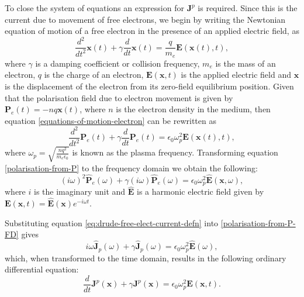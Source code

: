 To close the system of equations an expression for $\mathbf{J}^p$ is required. Since this is the current due to movement of free electrons, we begin by writing the Newtonian equation of motion of a free electron in the presence of an applied electric field, as
\begin{equation}
\frac{d^2}{dt^2}\mathbf{x}(t) + \gamma \frac{d}{dt} \mathbf{x}(t) = \frac{q}{m_e}\mathbf{E}(\mathbf{x}(t),t),
\label{equations-of-motion-electron}
\end{equation}
where $\gamma$ is a damping coefficient or collision frequency, $m_e$ is the mass of an electron, $q$ is the charge of an electron, $\mathbf{E}(\mathbf{x},t)$ is the applied electric field and $\mathbf{x}$ is the displacement of the electron from its zero-field equilibrium position. Given that the polarisation field due to electron movement is given by $ \mathbf{P}_e(t) = - n q \mathbf{x}(t)$, where $n$ is the electron density in the medium, then equation \ref{equations-of-motion-electron} can be rewritten as
\begin{equation}
\label{polarisation-from-P}
\frac{d^2}{dt^2}\mathbf{P}_e(t) + \gamma \frac{d}{dt} \mathbf{P}_e(t) = \epsilon_0 \omega_p^2 \mathbf{E}(\mathbf{x}(t),t),
\end{equation}
where $\omega_p = \sqrt{\frac{n q^2}{m_e \epsilon_0}}$ is known as the plasma frequency.
%
Transforming equation \ref{polarisation-from-P} to the frequency domain we obtain the following:
\begin{equation}
\label{polarisation-from-P-FD}
( i \omega )^2 \hat{\mathbf{P}}_e(\omega) + \gamma (i \omega) \hat{\mathbf{P}}_e(\omega) = \epsilon_0 \omega_p^2 \hat{\mathbf{E}}(\mathbf{x},\omega),
\end{equation}
where $i$ is the imaginary unit and $\hat{\mathbf{E}}$ is a harmonic electric field given by $\mathbf{E}(\mathbf{x},t) = \hat{\mathbf{E}}(\mathbf{x}) e^{- i \omega t }$.

Substituting equation \ref{eq:drude-free-elect-current-defn} into \ref{polarisation-from-P-FD} gives
\begin{equation}
    \label{eq:pol-current-freq-domain}
  i \omega \hat{\mathbf{J}}_p(\omega) + \gamma \hat{\mathbf{J}}_p(\omega) = \epsilon_0 \omega_p^2 \hat{\mathbf{E}}(\omega) ,
\end{equation}
which, when transformed to the time domain, results in the following ordinary differential equation:
\begin{equation}
  \frac{d}{dt} \mathbf{J}^p(\mathbf{x})+ \gamma \mathbf{J}^p(\mathbf{x}) = \epsilon_0 \omega_p^2 \mathbf{E}(\mathbf{x},t).
  \label{pol-current-ADE}
\end{equation}

